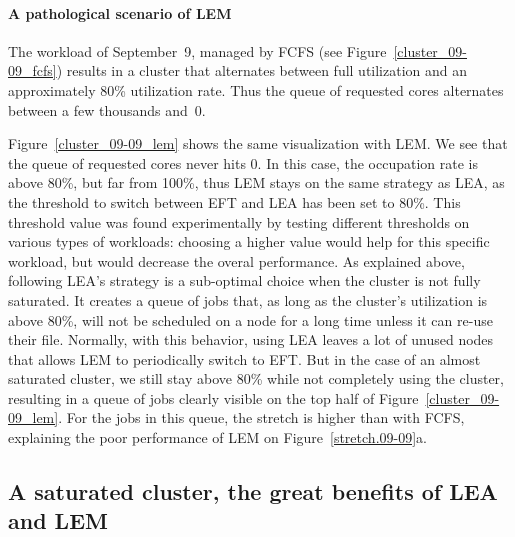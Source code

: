 \documentclass[conference,10pt]{IEEEtran}
\begin{document}
\paragraph{A pathological scenario of LEM}
The workload of September~9, managed by FCFS (see Figure~\ref{cluster_09-09_fcfs})
results in a cluster that alternates between full utilization and an approximately 80\% utilization rate.
Thus the queue of requested cores alternates between a few thousands and~0.

Figure~\ref{cluster_09-09_lem} shows the same visualization with LEM.
We see that the queue of requested cores never hits 0.
In this case, the occupation rate is above 80\%, but far from 100\%, thus LEM stays on the same strategy as LEA, as the threshold to switch between EFT and LEA has been set to 80\%. 
This threshold value was found experimentally by testing different thresholds on various types of workloads: choosing a higher value would help for this specific workload, but would decrease the overal performance.
As explained above, following LEA's strategy is a sub-optimal choice when the cluster is not fully saturated.
It creates a queue of jobs that, as long as the cluster's utilization is above 80\%, will not
be scheduled on a node for a long time unless it can re-use their file.
Normally, with this behavior, using LEA leaves a lot of unused nodes that allows LEM
to periodically switch to EFT. But in the case of an almost 
saturated cluster, we still stay above 80\% while not completely using the cluster,
resulting in a queue of jobs clearly visible on the top half of Figure~\ref{cluster_09-09_lem}.
For the jobs in this queue, the stretch is higher than with FCFS, explaining the poor performance of
LEM on Figure~\ref{stretch.09-09}a.

\subsection{A saturated cluster, the great benefits of LEA and LEM}\label{sec.03-26}
\end{document}
